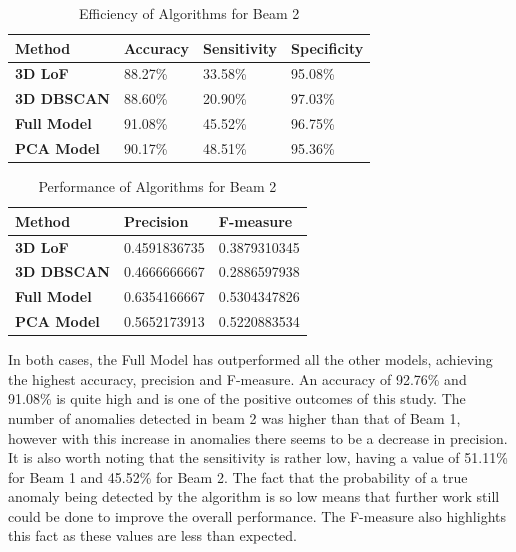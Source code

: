 \documentclass[conference, a4paper]{IEEEtran}
\begin{document}
	\begin{table}[!h]
		\renewcommand{\arraystretch}{1.3}
		\caption[Beam 2 Efficiency Metrics]{Efficiency of Algorithms for Beam 2}
		\label{tab::Beam2_efficiency}
		\centering 
		\begin{tabular}{|l|l|l|l|}
			\hline
			\textbf{Method}     & \textbf{Accuracy} & \textbf{Sensitivity} & \textbf{Specificity} \\ \hline
			\textbf{3D LoF}     & 88.27\%           & 33.58\%              & 95.08\%              \\ \hline
			\textbf{3D DBSCAN}  & 88.60\%           & 20.90\%              & 97.03\%              \\ \hline
			\textbf{Full Model} & 91.08\%           & 45.52\%              & 96.75\%              \\ \hline
			\textbf{PCA Model}  & 90.17\%           & 48.51\%              & 95.36\%              \\ \hline
		\end{tabular}
	\end{table}
	
	\begin{table}[!h]
		\renewcommand{\arraystretch}{1.3}
		\caption[Beam 2 Performance Metrics]{Performance of Algorithms for Beam 2}
		\label{tab::Beam2_performance}
		\centering
		\begin{tabular}{|l|l|l|}
			\hline
			\textbf{Method}     & \textbf{Precision} & \textbf{F-measure} \\ \hline
			\textbf{3D LoF}     & 0.4591836735       & 0.3879310345       \\ \hline
			\textbf{3D DBSCAN}  & 0.4666666667       & 0.2886597938       \\ \hline
			\textbf{Full Model} & 0.6354166667       & 0.5304347826       \\ \hline
			\textbf{PCA Model}  & 0.5652173913       & 0.5220883534       \\ \hline
		\end{tabular}
	\end{table}
	
	\par In both cases, the Full Model has outperformed all the other models, achieving the highest accuracy, precision and F-measure. An accuracy of 92.76\% and 91.08\% is quite high and is one of the positive outcomes of this study. The number of anomalies detected in beam 2 was higher than that of Beam 1, however with this increase in anomalies there seems to be a decrease in precision. It is also worth noting that the sensitivity is rather low, having a value of 51.11\% for Beam 1 and 45.52\% for Beam 2. The fact that the probability of a true anomaly being detected by the algorithm is so low means that further work still could be done to improve the overall performance. The F-measure also highlights this fact as these values are less than expected.
	
\end{document}
